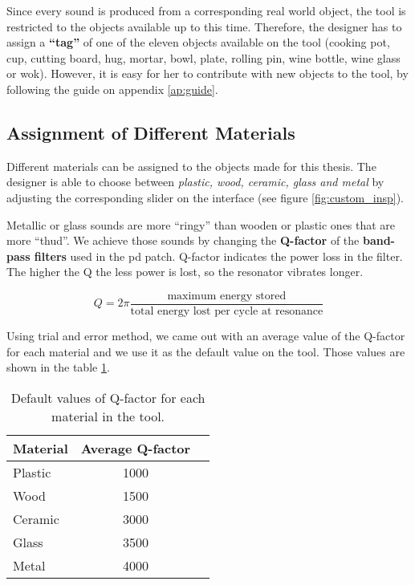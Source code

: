 Since every sound is produced from a corresponding real world object, the tool is restricted to the objects available up to this time. Therefore, the designer has to assign a \textbf{``tag''} of one of the eleven objects available on the tool (cooking pot, cup, cutting board, hug, mortar, bowl, plate, rolling pin, wine bottle, wine glass or wok). However, it is easy for her to contribute with new objects to the tool, by following the guide on appendix \ref{ap:guide}.

\subsection{Assignment of Different Materials}
Different materials can be assigned to the objects made for this thesis. The designer is able to choose between \textit{plastic, wood, ceramic, glass and metal} by adjusting the corresponding slider on the interface (see figure \ref{fig:custom_insp}). 

Metallic or glass sounds are more ``ringy'' than wooden or plastic ones that are more ``thud''. We achieve those sounds by changing the \textbf{Q-factor} of the \textbf{band-pass filters} used in the pd patch. Q-factor indicates the power loss in the filter. The higher the Q the less power is lost, so the resonator vibrates longer.

\begin{equation}\label{eq:Qfactor}
Q=2\pi \frac{\mbox{maximum energy stored}}{\mbox{total energy lost per cycle at resonance}}
\end{equation}\cite{bib:Q}

Using trial and error method, we came out with an average value of the Q-factor for each material and we use it as the default value on the tool. Those values are shown in the table \ref{tab:default_Q}.

\begin{table}[H]
	\centering
    \begin{tabular}{ | l | c | p{5cm} |}
    \hline
    \textbf{Material} & \textbf{Average Q-factor} \\ \hline
    Plastic & 1000 \\ \hline
    Wood & 1500 \\ \hline
    Ceramic & 3000 \\ \hline
    Glass & 3500 \\ \hline
    Metal & 4000 \\
    \hline
    \end{tabular}
    \caption{Default values of Q-factor for each material in the tool.}
    \label{tab:default_Q}
\end{table} 


